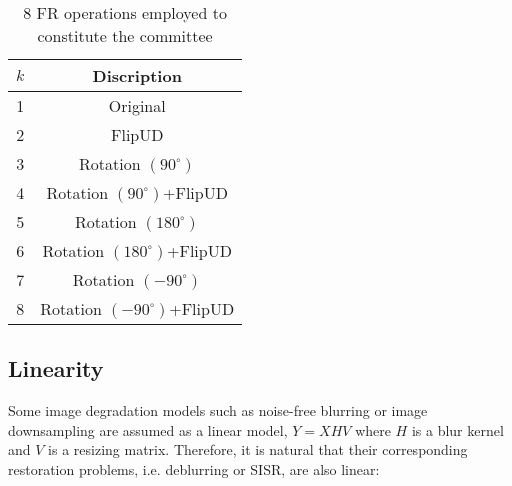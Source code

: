 \documentclass[journal]{IEEEtran}
\begin{document}
\begin{table}
	\caption{8 FR operations employed to constitute the committee}
	\vspace{.0cm}
	\label{table:Committe_FR}
	\centering
	\setlength{\tabcolsep}{5pt}
	\begin{tabular}{ |c|c| }
		\hline
	  $k$ & Discription \\
		\hline
		\hline
		1 & Original \\
		\hline
		2 & FlipUD  \\
		\hline
		3 & Rotation $(90^\circ)$   \\
		\hline
		4 & Rotation $(90^\circ)$+FlipUD  \\	
		\hline
		5 & Rotation $(180^\circ)$\\
		\hline		
		6 & Rotation $(180^\circ)$+FlipUD  \\
		\hline
		7 & Rotation $(-90^\circ)$ \\
		\hline
		8 & Rotation $(-90^\circ)$+FlipUD  \\
		\hline		
	\end{tabular}
\end{table}

\subsection{Linearity}
Some image degradation models such as noise-free blurring or image downsampling 
are assumed as a linear model, $Y = XHV$ where $H$ is a blur kernel and 
$V$ is a resizing matrix. Therefore, it is natural that their corresponding 
restoration problems, i.e. deblurring or SISR, are also linear:
\end{document}
